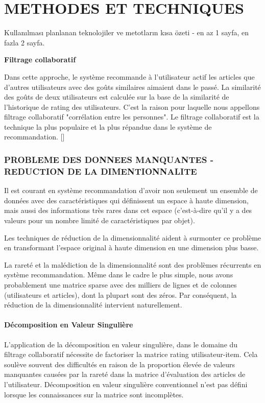 \chapter{METHODES ET TECHNIQUES}
\thispagestyle{empty}
 Kullanılması planlanan teknolojiler ve metotların kısa özeti - en az 1 sayfa, en fazla 2 sayfa. 
 
\textbf{Filtrage collaboratif }\

Dans cette approche, le système recommande à l\/'utilisateur actif les articles que d'autres utilisateurs avec des goûts similaires aimaient dans le passé. La similarité des goûts de deux utilisateurs est calculée sur la base de la similarité de l'historique de rating des utilisateurs. C'est la raison pour laquelle nous appellons filtrage collaboratif "corrélation entre les personnes". Le filtrage collaboratif est la technique la plus populaire et la plus répandue dans le système de recommandation. [\cite{ricci2011introduction}]

\subsection{PROBLEME DES DONNEES MANQUANTES - REDUCTION DE LA DIMENTIONNALITE}

Il est courant en système recommandation d'avoir non seulement un ensemble de données avec des caractéristiques qui définissent un espace à haute dimension, mais aussi des informations très rares dans cet espace (c'est-à-dire qu'il y a des valeurs pour un nombre limité de caractéristiques par objet). 

Les techniques de réduction de la dimensionnalité aident à surmonter ce problème en transformant l'espace original à haute dimension en une dimension plus basse. 

La rareté et la malédiction de la dimensionnalité sont des problèmes récurrents en système recommandation. Même dans le cadre le plus simple, nous avons probablement une matrice sparse avec des milliers de lignes et de colonnes (utilisateurs et articles), dont la plupart sont des zéros. Par conséquent, la réduction de la dimensionnalité intervient naturellement. 

\subsubsection{Décomposition en Valeur Singulière}

L'application de la décomposition en valeur singulière, dans le domaine du filtrage collaboratif nécessite de factoriser la matrice rating utilisateur-item. Cela soulève souvent des difficultés en raison de la proportion élevée de valeurs manquantes causées par la rareté dans la matrice d'évaluation des articles de l'utilisateur. Décomposition en valeur singulière conventionnel n'est pas défini lorsque les connaissances sur la matrice sont incomplètes. 

